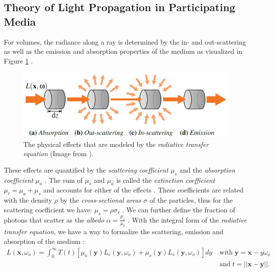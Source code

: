 \subsection{Theory of Light Propagation in Participating Media}
\label{subsec:theory_of_light_propagation_in_participating_media}
For volumes, the radiance along a ray is determined by the in- and out-scattering as well as the emission and absorption properties of the medium as visualized in Figure \ref{fig:novak_volume_effects} \cite{novak_overview}.
\begin{figure}[ht]
    \centering
    \includegraphics[width=0.7\linewidth]{img/novak_volume_effects.png}
    \caption[Physical effects in a volume]{The physical effects that are modeled by the \textit{radiative transfer equation} (Image from \cite{novak_overview}).}
    \label{fig:novak_volume_effects}
\end{figure}
These effects are quantified by the \textit{scattering coefficient} $\mu_s$ and the \textit{absorption coefficient} $\mu_a$ \cite{novak_overview}.
The sum of $\mu_s$ and $\mu_a$ is called the \textit{extinction coefficient} $\mu_t=\mu_a + \mu_s$ and accounts for either of the effects \cite{novak_overview}.
These coefficients are related with the density $\rho$ by the \textit{cross-sectional areas} $\sigma$ of the particles, thus for the scattering coefficient we have: $\mu_s = \rho \sigma_s$ \cite{novak_overview}.
We can further define the fraction of photons that scatter as the \textit{albedo} $\alpha=\frac{\mu_s}{\mu_t}$ \cite{novak_overview}.
With the integral form of the \textit{radiative transfer equation}, we have a way to formalize the scattering, emission and absorption of the medium \cite{novak_overview}:
\begin{equation}
    \begin{split}
        \label{eq:radiative_transfer}
        L(\boldsymbol{x}, \omega_o) = \int_0^\infty T(t)[\mu_a(\boldsymbol{y})L_e(\boldsymbol{y}, \omega_o) + \mu_s(\boldsymbol{y})L_s(\boldsymbol{y}, \omega_o)]dy & \;\text{with}\; \boldsymbol{y}=\boldsymbol{x} - y\omega_o \\
                                                                                                                                                                    & \;\text{and}\; t=||\boldsymbol{x}-\boldsymbol{y}||.
    \end{split}
\end{equation}
